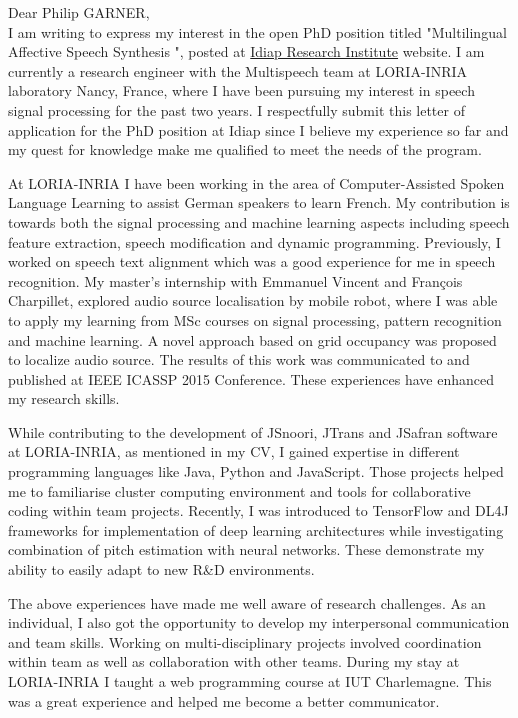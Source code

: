 \documentclass[10pt,a4paper]{letter}
\begin{document}
Dear Philip GARNER,\\


		I am writing to express my interest in the open PhD position titled "Multilingual Affective Speech Synthesis ", posted at \href{https://www.idiap.ch/education-and-jobs}{Idiap Research Institute} website. I am currently a research engineer with the Multispeech team at LORIA-INRIA laboratory Nancy, France, where I have been pursuing my interest in speech signal processing for the past two years. I respectfully submit this letter of application for the PhD position at 
Idiap since I believe my experience so far and my quest for knowledge 
make me qualified to meet the needs of the program. 
		
		At LORIA\--INRIA I have been working in the area of Computer-Assisted Spoken Language Learning to assist German speakers to learn French. My contribution is towards both the signal processing and machine learning aspects including speech feature extraction, speech modification and dynamic programming. Previously, I worked on speech text alignment which was a good experience for me in speech recognition. My master's internship with Emmanuel Vincent and François Charpillet, explored audio source localisation by mobile robot, where I was able to apply my learning from MSc courses on signal processing, pattern recognition and machine learning. A novel approach based on grid occupancy was proposed to localize audio source. The results of this work was communicated to and  published at IEEE ICASSP 2015 Conference. These experiences have enhanced my research skills.   

		
		While contributing to the development of JSnoori, JTrans and J\-Safran software at LORIA\--INRIA, as mentioned in my CV, I gained expertise in different programming languages like Java, Python and JavaScript. Those projects helped me to familiarise  cluster computing environment	and tools for collaborative coding within team projects. Recently, I was introduced to TensorFlow and DL4J frameworks for implementation of deep learning architectures while investigating combination of pitch estimation with  neural networks. These demonstrate my ability to easily adapt to new R\&D environments.    
		
		The above experiences have made me well aware of  research challenges. As an individual, I also got the opportunity to develop my interpersonal communication and team 		
skills. Working on multi-disciplinary projects involved coordination within  team as well as collaboration with other teams. During my stay at LORIA\--INRIA I taught a web programming course at IUT Charlemagne. This was a great experience and helped me become a better communicator. 
\end{document}
